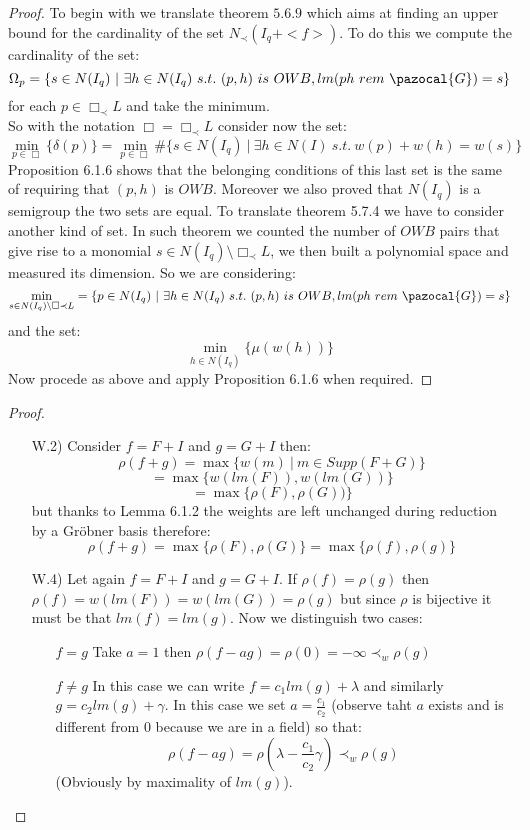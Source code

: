 \documentclass[11pt,a4paper]{report}
\theoremstyle{plain}
\theoremstyle{definition}
\newcommand{\G}{\pazocal{G}}
\begin{document}
\begin{thm-hand}[6.1.7]
\end{thm-hand}
\begin{proof}
	To begin with we translate theorem $5.6.9$ which aims at finding an upper bound for the cardinality of the set $N_\prec(I_q + <f>)$. To do this we compute the cardinality of the set:
	\[
		\Omega_p = \{s \in N(I_q)\ |\ \exists h \in N(I_q)\ s.t.\ (p,h)\ is\ OWB, lm(ph\ rem\ \G) = s\}
	\]
	for each $p \in \Box_\prec L$ and take the minimum.\\
	So with the notation $\Box = \Box_\prec L$ consider now the set:
	\[
		\min\limits_{p \in \Box}\{ \delta(p)\} = \min\limits_{p \in \Box} \#\{s \in N(I_q)\ |\ \exists h \in N(I)\ s.t.\ w(p) + w(h) = w(s)\}
	\]
	Proposition 6.1.6 shows that the belonging conditions of this last set is the same of requiring that $(p,h)$ is $OWB$. Moreover we also proved that $N(I_q)$ is a semigroup the two sets are equal.
	To translate theorem 5.7.4 we have to consider another kind of set. In such theorem we counted the number of $OWB$ pairs that give rise to a monomial $s \in N(I_q) \setminus \Box_\prec L$, we then built a polynomial space and measured its dimension. So we are considering:
	\[
		\min\limits_{s \in N(I_q) \setminus \Box\prec L} = \{p \in N(I_q)\ |\ \exists h \in N(I_q)\ s.t.\ (p,h)\ is\ OWB, lm(ph\ rem\ \G) = s\}
	\]
	and the set:
	\[
		\min\limits_{h \in N(I_q)}\{\mu(w(h))\}	
	\]
	Now procede as above and apply Proposition 6.1.6 when required.
\end{proof}

\begin{thm-hand}[6.2.5]
\end{thm-hand}
\begin{proof}
	\begin{itemize}
		\item[W.2)] Consider $f = F+I$ and $g = G +I$ then:
		\[
			\rho(f+g) = \max\{w(m)\ |\ m \in Supp(F+G)\}
		\]
		\[
			= \max\{w(lm(F)),w(lm(G))\}	
		\]
		\[
			 = \max\{\rho(F),\rho(G))\}
		\]
		but thanks to Lemma 6.1.2 the weights are left unchanged during reduction by a Gr\"obner basis therefore:
		\[
			\rho(f+g) = \max\{\rho(F),\rho(G)\} = \max\{\rho(f),\rho(g)\}
		\]
		\item[W.4)] Let again $f = F+I$ and $g = G +I$. If $\rho(f) = \rho(g)$ then $\rho(f) = w(lm(F)) = w(lm(G)) = \rho(g)$ but since $\rho$ is bijective it must be that $lm(f) = lm(g)$. Now we distinguish two cases:
			\begin{itemize}
				\item[$f = g$] Take $a = 1$ then $\rho(f - ag) = \rho(0) = -\infty \prec_w \rho(g)$
				\item[$f\ne g$] In this case we can write $f = c_1lm(g) + \lambda$ and similarly $g = c_2lm(g) + \gamma$. In this case we set $a = \frac{c_1}{c_2}$ (observe taht $a$ exists and is different from $0$ because we are in a field) so that:
				 \[
				 	\rho(f - ag) = \rho(\lambda - \frac{c_1}{c_2}\gamma) \prec_w \rho(g)
				 \]
				 (Obviously by maximality of $lm(g)$).
			\end{itemize}
	\end{itemize}
\end{proof}
\end{document}
